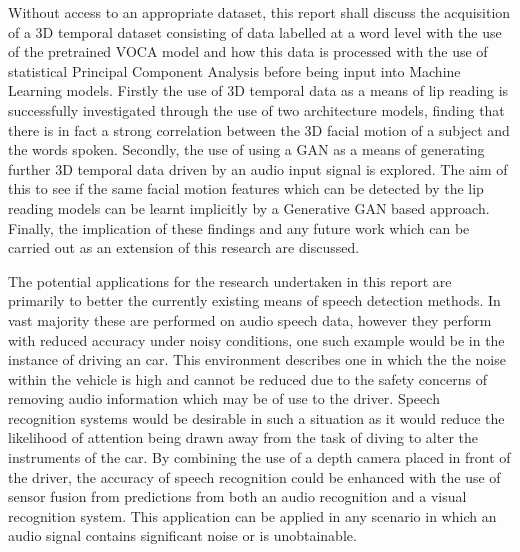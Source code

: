 Without access to an appropriate dataset, this report shall discuss the acquisition of a 3D temporal dataset consisting of data labelled at a word level with the use of the pretrained VOCA model \cite{Cudeiro2019} and how this data is processed with the use of statistical Principal Component Analysis before being input into Machine Learning models.
Firstly the use of 3D temporal data as a means of lip reading is successfully investigated through the use of two architecture models, finding that there is in fact a strong correlation between the 3D facial motion of a subject and the words spoken.
Secondly, the use of using a GAN as a means of generating further 3D temporal data driven by an audio input signal is explored.
The aim of this to see if the same facial motion features which can be detected by the lip reading models can be learnt implicitly by a Generative GAN based approach.
Finally, the implication of these findings and any future work which can be carried out as an extension of this research are discussed.

The potential applications for the research undertaken in this report are primarily to better the currently existing means of speech detection methods.
In vast majority these are performed on audio speech data, however they perform with reduced accuracy under noisy conditions, one such example would be in the instance of driving an car.
This environment describes one in which the the noise within the vehicle is high and cannot be reduced due to the safety concerns of removing audio information which may be of use to the driver.
Speech recognition systems would be desirable in such a situation as it would reduce the likelihood of attention being drawn away from the task of diving to alter the instruments of the car.
By combining the use of a depth camera placed in front of the driver, the accuracy of speech recognition could be enhanced with the use of sensor fusion from predictions from both an audio recognition and a visual recognition system.
This application can be applied in any scenario in which an audio signal contains significant noise or is unobtainable.